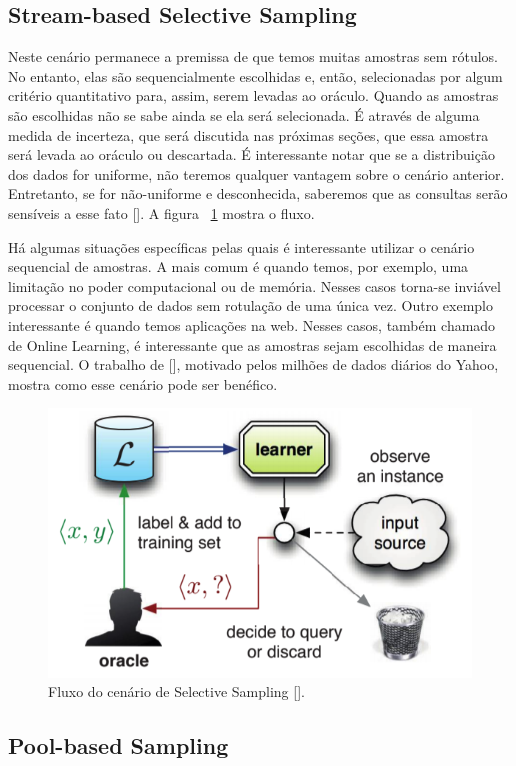 \subsection{Stream-based Selective Sampling}
\label{sec:cenarios_selective_sampling}

Neste cenário permanece a premissa de que temos muitas amostras sem rótulos. No entanto, elas são sequencialmente escolhidas e, então, selecionadas por algum critério quantitativo para, assim, serem levadas ao oráculo. Quando as amostras são escolhidas não se sabe ainda se ela será selecionada. É através de alguma medida de incerteza, que será discutida nas próximas seções, que essa amostra será levada ao oráculo ou descartada. É interessante notar que se a distribuição dos dados for uniforme, não teremos qualquer vantagem sobre o cenário anterior. Entretanto, se for não-uniforme e desconhecida, saberemos que as consultas serão sensíveis a esse fato [\cite{settles2014active}]. A figura ~\ref{fig:settles_2014_selective_sampling} mostra o fluxo. 

Há algumas situações específicas pelas quais é interessante utilizar o cenário sequencial de amostras. A mais comum é quando temos, por exemplo, uma limitação no poder computacional ou de memória. Nesses casos torna-se inviável processar o conjunto de dados sem rotulação de uma única vez. Outro exemplo interessante é quando temos aplicações na web. Nesses casos, também chamado de Online Learning, é interessante que as amostras sejam escolhidas de maneira sequencial. O trabalho de [\cite{chu2011unbiased}], motivado pelos milhões de dados diários do Yahoo, mostra como esse cenário pode ser benéfico. 


\begin{figure}
  \centering
  \includegraphics[width=.5\textwidth]{figures/settles_2014_selective_sampling.png}
  \caption{Fluxo do cenário de Selective Sampling [\cite{settles2014active}].}
  \label{fig:settles_2014_selective_sampling}
\end{figure}



\subsection{Pool-based Sampling}
\label{sec:cenarios_pool}


